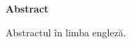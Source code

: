 \thispagestyle{plain}

\begin{center}
	\Large \textbf{Abstract}	
\end{center}

Abstractul în limba engleză.

\vspace*{\fill}
